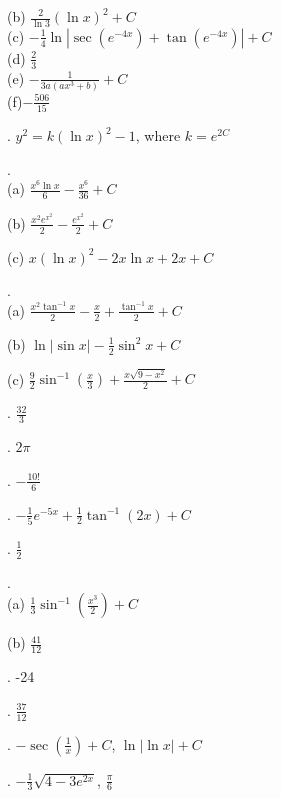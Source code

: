 \documentclass[12pt]{article}
\begin{document}
\noindent (b) $\frac{2}{\ln 3} (\ln x)^2 + C$\\

\noindent (c) $-\frac{1}{4} \ln | \sec (e^{-4x}) + \tan (e^{-4x}) | + C$\\

\noindent (d) $\frac{2}{3}$\\

\noindent (e) $-\frac{1}{3a(ax^3+b)} + C$\\

\noindent (f)$-{\frac{506}{15}}$
\medskip

.  $y^2 = k(\ln x)^2 -1$, where  $k = e^{2C}$
\medskip

.\\
(a) ${\frac{x^6 \ln x}{6}} - {\frac{x^6}{36}} + C$

\noindent (b)  ${\frac{x^2 e^{x^2}}{2}} - {\frac{e^{x^2}}{2}} + C$  

\noindent (c)  $x (\ln x)^2 - 2x \ln x + 2x + C$
\medskip

.\\
(a) ${\frac{x^2 \tan^{-1} x}{2}} - {\frac{x}{2}} + {\frac{\tan^{-1} 
x}{2}} + C$
\medskip

\noindent (b) $\ln | \sin x| - {\frac{1}{2}} \sin^2 x + C$
\medskip

\noindent (c) ${\frac{9}{2}} \sin^{-1} \left ( {\frac{x}{3}} \right ) + {\frac{x 
\sqrt{9-x^2}}{2}} + C$
\medskip

.  ${\frac{32}{3}}$ 
\medskip

.  $2 \pi$ 
\medskip

.  $-{\frac{10!}{6}}$
\medskip

.  $-{\frac{1}{5}} e^{-5x} + {\frac{1}{2}} \tan^{-1} (2x) + C$
\medskip

.  ${\frac{1}{2}}$
\medskip

.\\  (a) ${\frac{1}{3}} \sin^{-1} \left ({\frac{x^3}{2}} 
\right) + C$
\medskip

\noindent (b) ${\frac{41}{12}}$ 
\medskip

.  -24
\medskip

.  ${\frac{37}{12}}$
\medskip

.  $- \sec \left ( {\frac{1}{x}} \right ) + C$, $\ln |\ln x| + C$
\medskip

.  $-{\frac{1}{3}} \sqrt{4-3e^{2x}}$, ${\frac{\pi}{6}}$
\medskip
\end{document}
